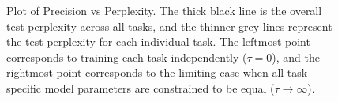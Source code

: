 \documentclass[fullpaper,final]{nldl}
\begin{document}
\begin{figure}[ht]
    \caption{Plot of Precision vs Perplexity. The thick black line is the overall test perplexity across all tasks, and the thinner grey lines represent the test perplexity for each individual task. The leftmost point corresponds to training each task independently ($\tau = 0$), and the rightmost point corresponds to the limiting case when all task-specific model parameters are constrained to be equal ($\tau \rightarrow \infty$).}
    \label{fig:results_plot}
\end{figure}
\end{document}
